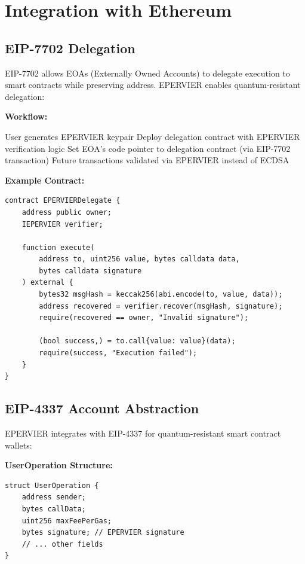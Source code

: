 \section{Integration with Ethereum}


\subsection{EIP-7702 Delegation}

EIP-7702 allows EOAs (Externally Owned Accounts) to delegate execution to smart contracts while preserving address. EPERVIER enables quantum-resistant delegation:

\textbf{Workflow:}
\begin{algorithmic}[1]
\STATE User generates EPERVIER keypair
\STATE Deploy delegation contract with EPERVIER verification logic
\STATE Set EOA's code pointer to delegation contract (via EIP-7702 transaction)
\STATE Future transactions validated via EPERVIER instead of ECDSA
\end{algorithmic}

\textbf{Example Contract:}
\begin{lstlisting}[language=Solidity]
contract EPERVIERDelegate {
    address public owner;
    IEPERVIER verifier;

    function execute(
        address to, uint256 value, bytes calldata data,
        bytes calldata signature
    ) external {
        bytes32 msgHash = keccak256(abi.encode(to, value, data));
        address recovered = verifier.recover(msgHash, signature);
        require(recovered == owner, "Invalid signature");

        (bool success,) = to.call{value: value}(data);
        require(success, "Execution failed");
    }
}
\end{lstlisting}

\subsection{EIP-4337 Account Abstraction}

EPERVIER integrates with EIP-4337 for quantum-resistant smart contract wallets:

\textbf{UserOperation Structure:}
\begin{lstlisting}
struct UserOperation {
    address sender;
    bytes callData;
    uint256 maxFeePerGas;
    bytes signature; // EPERVIER signature
    // ... other fields
}
\end{lstlisting}

